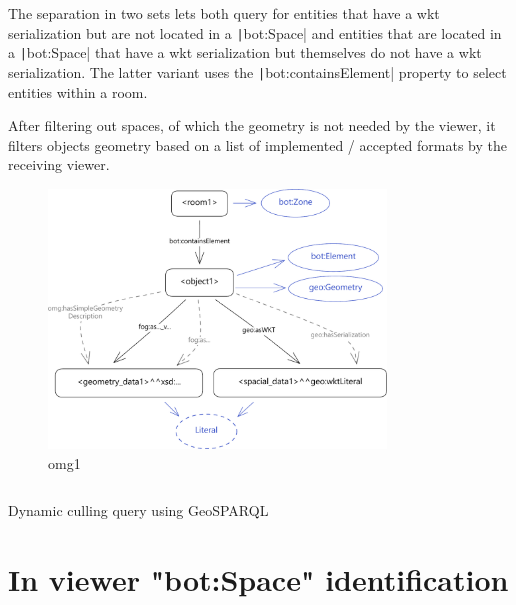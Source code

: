 The separation in two sets lets both query for entities that have a \ac{wkt} serialization but are not located in a \texttt|bot:Space| and entities that are located in a \texttt|bot:Space| that have a \ac{wkt} serialization but themselves do not have a \ac{wkt} serialization. The latter variant uses the \texttt|bot:containsElement| property to select entities within a room.

After filtering out spaces, of which the geometry is not  needed by the viewer, it filters objects geometry based on a list of implemented / accepted formats by the receiving viewer. 


\begin{figure}[H]
    \begin{adjustwidth}{-0.8cm}{-0.8cm}
        \centering
        \includegraphics[width=0.8\textwidth]{figures/pdf/omg1.pdf}
        \caption{omg1}
        \label{fig:omg1}
    \end{adjustwidth}
\end{figure}



\begin{listing}[H]
    \inputminted{sparql}{dynamicQueries/inSitu/query.rq}
    \vspace{-0.7cm}
    \caption{Dynamic culling query using GeoSPARQL}
    \label{lst:GeoSPARQLauto}
\end{listing}


\section{In viewer "bot:Space" identification}

